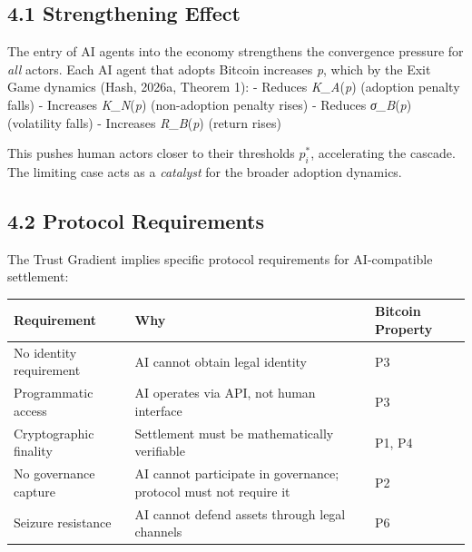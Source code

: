 \documentclass[12pt]{article}
\theoremstyle{definition}
\theoremstyle{remark}
\begin{document}
\subsection{4.1 Strengthening Effect}\label{strengthening-effect}

The entry of AI agents into the economy strengthens the convergence
pressure for \emph{all} actors. Each AI agent that adopts Bitcoin
increases \emph{p}, which by the Exit Game dynamics (Hash, 2026a,
Theorem 1): - Reduces \emph{K\_A}(\emph{p}) (adoption penalty falls) -
Increases \emph{K\_N}(\emph{p}) (non-adoption penalty rises) - Reduces
\emph{σ\_B}(\emph{p}) (volatility falls) - Increases
\emph{R\_B}(\emph{p}) (return rises)

This pushes human actors closer to their thresholds $p_i^*$,
accelerating the cascade. The limiting case acts as a \emph{catalyst}
for the broader adoption dynamics.

\subsection{4.2 Protocol Requirements}\label{protocol-requirements}

The Trust Gradient implies specific protocol requirements for
AI-compatible settlement:

{%
\begin{longtable}[]{@{}
  >{\raggedright\arraybackslash}p{}
  >{\raggedright\arraybackslash}p{}
  >{\raggedright\arraybackslash}p{}@{}}
\toprule\noalign{}
\begin{minipage}[b]{\linewidth}\raggedright
Requirement
\end{minipage} & \begin{minipage}[b]{\linewidth}\raggedright
Why
\end{minipage} & \begin{minipage}[b]{\linewidth}\raggedright
Bitcoin Property
\end{minipage} \\
\midrule\noalign{}
\endhead
\bottomrule\noalign{}
\endlastfoot
No identity requirement & AI cannot obtain legal identity & P3 \\
Programmatic access & AI operates via API, not human interface & P3 \\
Cryptographic finality & Settlement must be mathematically verifiable &
P1, P4 \\
No governance capture & AI cannot participate in governance; protocol
must not require it & P2 \\
Seizure resistance & AI cannot defend assets through legal channels &
P6 \\
\end{longtable}
}
\end{document}
